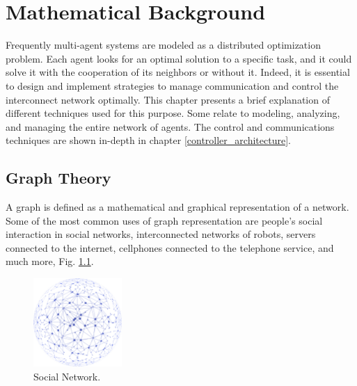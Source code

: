 \chapter{Mathematical Background}

Frequently multi-agent systems are modeled as a distributed optimization problem. Each agent looks for an optimal solution to a specific task, and it could solve it with the cooperation of its neighbors or without it. Indeed, it is essential to design and implement strategies to manage communication and control the interconnect network optimally. This chapter presents a brief explanation of different techniques used for this purpose. Some relate to modeling, analyzing, and managing the entire network of agents. The control and communications techniques are shown in-depth in chapter \ref{controller_architecture}. 
\\


\section{Graph Theory}
\label{sec:game_theory}



A graph is defined as a mathematical and graphical representation of a network. Some of the most common uses of graph representation are people's social interaction in social networks, interconnected networks of robots, servers connected to the internet, cellphones connected to the telephone service, and much more, Fig.  \ref{fig:Social_net}.


\begin{figure}[h]
\begin{center}
    \includegraphics[width=0.3\textwidth]{Kap2/Network.png}
    \caption{Social Network.}
    \label{fig:Social_net}
\end{center}
\end{figure}




